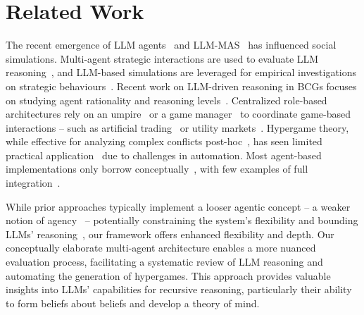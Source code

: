 \section{Related Work}
The recent emergence of LLM agents~\cite{wang2024survey} and LLM-MAS~\cite{li2024survey} has influenced social simulations. Multi-agent strategic interactions are used to evaluate LLM reasoning~\cite{mensfelt2024logicenhancedlanguagemodelagents,duan2024gtbench}, and LLM-based simulations are leveraged for empirical investigations on strategic behaviours~\cite{mao2024alympicsllmagentsmeet,mensfelt2024autoformalizing}. Recent work on LLM-driven reasoning in BCGs focuses on studying agent rationality and reasoning levels~\cite{zhang2024klevelreasoningestablishinghigher,lu2024strategicinteractionslargelanguage,guo2024economicsarenalargelanguage}. Centralized role-based architectures rely on an umpire~\cite{STATHIS1998401} or a game manager~\cite{gamemaster-gameplayerMAS2007} to coordinate game-based interactions -- such as artificial trading~\cite{tradingagentcompetition} or utility markets~\cite{master-slave-energymanagement,masterslavegames2024}.
Hypergame theory, while effective for analyzing complex conflicts post-hoc~\cite{Bennett1980}, has seen limited practical application~\cite{BENNETT1981shippingcrisis} due to challenges in automation. Most agent-based implementations only borrow conceptually~\cite{dharmadhikari2021hypergamepathplanning,Aitchison2021deceptionhypergames}, with few examples of full integration~\cite{Kahn2021thesis,TANG2024networkattackdefense}.

While prior approaches typically implement a looser agentic concept -- a weaker notion of agency~\cite{Wooldridge_Jennings_1995} -- potentially constraining the system's flexibility and bounding LLMs' reasoning~\cite{wang2025limitsllmbasedhumansimulation}, our framework offers enhanced flexibility and depth. Our conceptually elaborate multi-agent architecture enables a more nuanced evaluation process, facilitating a systematic review of LLM reasoning and automating the generation of hypergames. This approach provides valuable insights into LLMs' capabilities for recursive reasoning, particularly their ability to form beliefs about beliefs and develop a theory of mind.